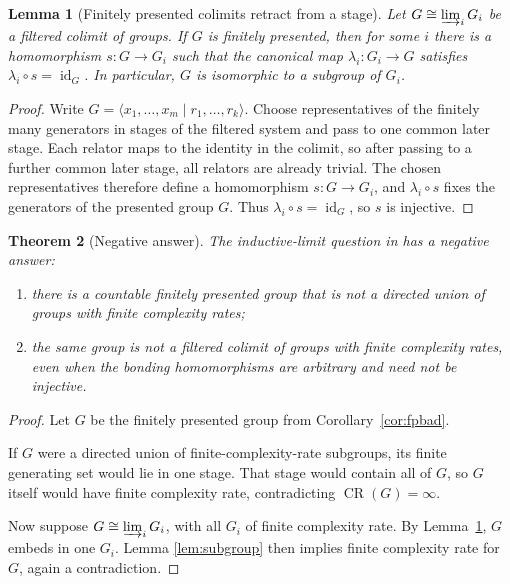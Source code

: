 \documentclass[11pt]{article}
\newtheorem{theorem}{Theorem}
\newtheorem{lemma}[theorem]{Lemma}
\newcommand{\CR}{\operatorname{CR}}
\newcommand{\directlim}{\varinjlim}
\begin{document}
\begin{lemma}[Finitely presented colimits retract from a stage]\label{lem:retract}
Let \(G\cong\directlim_i G_i\) be a filtered colimit of groups.  If \(G\) is
finitely presented, then for some \(i\) there is a homomorphism
\(s:G\to G_i\) such that the canonical map \(\lambda_i:G_i\to G\) satisfies
\(\lambda_i\circ s=\operatorname{id}_G\).  In particular, \(G\) is isomorphic
to a subgroup of \(G_i\).
\end{lemma}

\begin{proof}
Write \(G=\langle x_1,\ldots,x_m\mid r_1,\ldots,r_k\rangle\).  Choose
representatives of the finitely many generators in stages of the filtered
system and pass to one common later stage.  Each relator maps to the identity
in the colimit, so after passing to a further common later stage, all relators
are already trivial.  The chosen representatives therefore define a
homomorphism \(s:G\to G_i\), and \(\lambda_i\circ s\) fixes the generators of
the presented group \(G\).  Thus \(\lambda_i\circ s=\operatorname{id}_G\), so
\(s\) is injective.
\end{proof}

\begin{theorem}[Negative answer]\label{thm:negative}
The inductive-limit question in \cite{TianYu2026} has a negative answer:
\begin{enumerate}
  \item there is a countable finitely presented group that is not a directed
  union of groups with finite complexity rates;
  \item the same group is not a filtered colimit of groups with finite
  complexity rates, even when the bonding homomorphisms are arbitrary and need
  not be injective.
\end{enumerate}
\end{theorem}

\begin{proof}
Let \(G\) be the finitely presented group from Corollary~\ref{cor:fpbad}.

If \(G\) were a directed union of finite-complexity-rate subgroups, its finite
generating set would lie in one stage.  That stage would contain all of \(G\),
so \(G\) itself would have finite complexity rate, contradicting
\(\CR(G)=\infty\).

Now suppose \(G\cong\directlim_i G_i\), with all \(G_i\) of finite complexity
rate.  By Lemma~\ref{lem:retract}, \(G\) embeds in one \(G_i\).  Lemma
\ref{lem:subgroup} then implies finite complexity rate for \(G\), again a
contradiction.
\end{proof}
\end{document}
